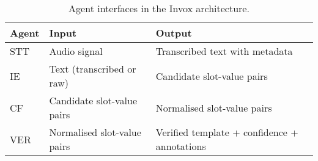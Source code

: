 \begin{table}[H]
\centering
\begin{tabular}{p{3cm}p{4cm}p{6cm}}
\toprule
\textbf{Agent} & \textbf{Input} & \textbf{Output} \\
\midrule
STT & Audio signal & Transcribed text with metadata \\
IE & Text (transcribed or raw) & Candidate slot-value pairs \\
CF & Candidate slot-value pairs & Normalised slot-value pairs \\
VER & Normalised slot-value pairs & Verified template + confidence + annotations \\
\bottomrule
\end{tabular}
\caption{Agent interfaces in the Invox architecture.}
\label{tab:agent-interfaces}
\end{table}



